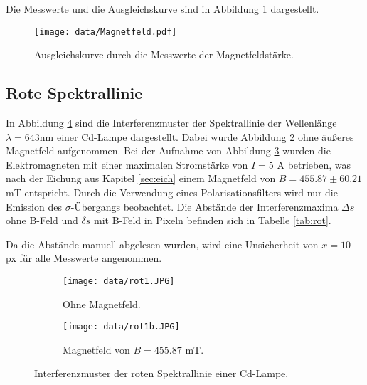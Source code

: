 \noindent
Die Messwerte und die Ausgleichskurve sind in Abbildung \ref{fig:bfeld} dargestellt.

\begin{figure}
    \centering
    \texttt{[image: data/Magnetfeld.pdf]}
    \caption{Ausgleichskurve durch die Messwerte der Magnetfeldstärke.}
    \label{fig:bfeld}
  \end{figure}

\newpage
\subsection{Rote Spektrallinie}
In Abbildung \ref{fig:rot} sind die Interferenzmuster der Spektrallinie der Wellenlänge $\lambda = 643$nm einer Cd-Lampe dargestellt.
Dabei wurde Abbildung \ref{fig:rot1} ohne äußeres Magnetfeld aufgenommen.
Bei der Aufnahme von Abbildung \ref{fig:rot1b} wurden die Elektromagneten mit einer maximalen Stromstärke von $I=5$ A betrieben, was nach der Eichung aus Kapitel \ref{sec:eich} einem Magnetfeld von $B= 455.87 \pm 60.21$ mT entspricht.
Durch die Verwendung eines Polarisationsfilters wird nur die Emission des $\sigma$-Übergangs beobachtet.
Die Abstände der Interferenzmaxima $\Delta s$ ohne B-Feld und $\delta s$ mit B-Feld in Pixeln befinden sich in Tabelle \ref{tab:rot}.


\noindent
Da die Abstände manuell abgelesen wurden, wird eine Unsicherheit von $x=10$ px für alle Messwerte angenommen.


\begin{figure}[H]
	\centering
	\begin{subfigure}[b]{0.8\textwidth}
		\centering
		\texttt{[image: data/rot1.JPG]}
		\caption{Ohne Magnetfeld.}
    \label{fig:rot1}
	\end{subfigure}
	
	\begin{subfigure}[b]{0.8\textwidth}
		\centering
		\texttt{[image: data/rot1b.JPG]}
		\caption{Magnetfeld von $B= 455.87$ mT.}
    \label{fig:rot1b}
	\end{subfigure}
    \caption{Interferenzmuster der roten Spektrallinie einer Cd-Lampe.}
\label{fig:rot}
\end{figure}


